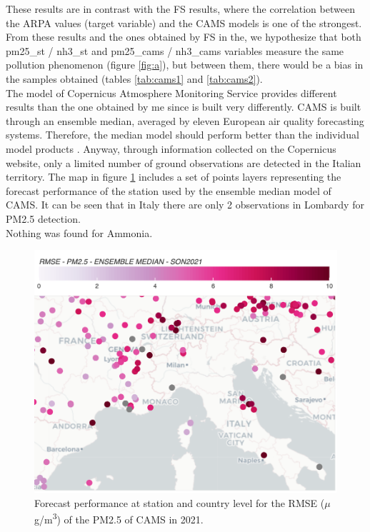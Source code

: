These results are in contrast with the FS results, where the correlation between the ARPA values (target variable) and the CAMS models is one of the strongest.
From these results and the ones obtained by FS in the, we hypothesize that both pm25\_st / nh3\_st and pm25\_cams / nh3\_cams variables measure the same pollution phenomenon (figure \ref{fig:a}), but between them, there would be a bias in the samples obtained (tables \ref{tab:cams1} and \ref{tab:cams2}).\\
The model of Copernicus Atmosphere Monitoring Service provides different results than the one obtained by me since is built very differently. CAMS is built through an ensemble median, averaged by eleven European air quality forecasting systems. Therefore, the median model should perform better than the individual model products \cite{riccio2007seeking}.
Anyway, through information collected on the Copernicus website, only a limited number of ground observations are detected in the Italian territory. 
The map in figure \ref{fig:cams} includes a set of points layers representing the forecast performance of the station used by the ensemble median model of CAMS.
It can be seen that in Italy there are only 2 observations in Lombardy for PM2.5 detection.\\
Nothing was found for Ammonia.
\begin{figure}[H]
    \centering
    \includegraphics[scale=0.25]{images/cams_obs.png}
    \caption{Forecast performance at station and country level for the RMSE ($\mu$g/m\textsuperscript{3}) of the PM2.5 of CAMS \cite{camsobs} in 2021. 
}
    \label{fig:cams}
\end{figure}


